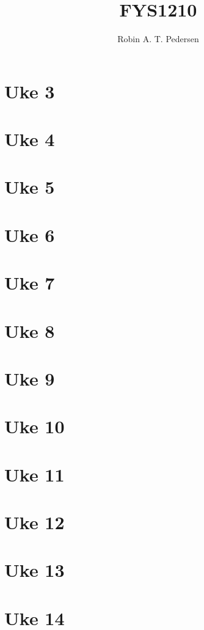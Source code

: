\documentclass{article}
\begin{document}
  \title{FYS1210}
  \author{Robin A. T. Pedersen}
  \maketitle
  \tableofcontents

  \begin{abstract}
    
  \end{abstract}

  \section{Uke 3}
    

  \section{Uke 4}
  \section{Uke 5}
  \section{Uke 6}
  \section{Uke 7}
  \section{Uke 8}
  \section{Uke 9}
  \section{Uke 10}
  \section{Uke 11}
  \section{Uke 12}
  \section{Uke 13}
  \section{Uke 14}
\end{document}
